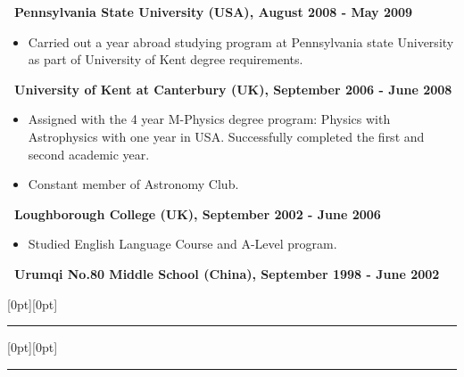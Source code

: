 \documentclass[letterpaper,12pt]{letter}
\begin{document}
\textbf{\normalsize ~Pennsylvania State University (USA), August 2008 - May 2009}  \\[-8mm] 

\begin{itemize}
\item \textrm{\normalsize Carried out a year abroad studying program at Pennsylvania state University as part of University of Kent degree requirements.}
\end{itemize}

\textbf{\normalsize ~University of Kent at Canterbury (UK), September 2006 - June 2008}  \\[-8mm] 
\begin{itemize}
\item \textrm{\normalsize Assigned with the 4 year M-Physics degree program: Physics with Astrophysics with one year in USA. Successfully completed the first and second academic year.}
\item \textrm{\normalsize Constant member of Astronomy Club.}
\end{itemize}

\textbf{\normalsize ~Loughborough College (UK), September 2002 - June 2006}  \\[-8mm] 
\begin{itemize}
\item \textrm{\normalsize Studied English Language Course and A-Level program.}
\end{itemize}

\textbf{\normalsize ~Urumqi No.80 Middle School (China), September 1998 - June 2002} \\[-8mm] 


\vspace{3mm}



\raisebox{0pt}[0pt][0pt]{\Large\textbf{\raisebox{-3.5ex}{Publications}}}
\\[2mm]
\rule[-0.5cm]{10cm}{1pt}

\vspace{-3mm}

\raisebox{0pt}[0pt][0pt]{\large\textbf{\raisebox{-3.5ex}{Technical Report}}}
\\[2mm]
\rule[-0.3cm]{4cm}{1pt}
\end{document}
